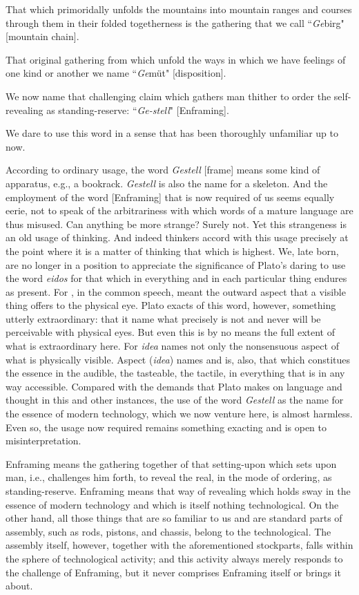 That which primoridally unfolds the mountains into mountain ranges and courses through them in their folded togetherness is the gathering that we call ``\textit{Ge}birg" [mountain chain].

That original gathering from which unfold the ways in which we have feelings of one kind or another we name ``\textit{Ge}m\"{u}t" [disposition].

We now name that challenging claim which gathers man thither to order the self-revealing as standing-reserve: ``\textit{Ge-stell}" [Enframing].

We dare to use this word in a sense that has been thoroughly unfamiliar up to now.

According to ordinary usage, the word \textit{Gestell} [frame] means some kind of apparatus, e.g., a bookrack. \textit{Gestell} is also the name for a skeleton. And the employment of the word  [Enframing] that is now required of us seems equally eerie, not to speak of the arbitrariness with which words of a mature language are thus misused. Can anything be more strange? Surely not. Yet this strangeness is an old usage of thinking. And indeed thinkers accord with this usage precisely at the point where it is a matter of thinking that which is highest. We, late born, are no longer in a position to appreciate the significance of Plato's daring to use the word \textit{eidos} for that which in everything and in each particular thing endures as present. For , in the common speech, meant the outward aspect that a visible thing offers to the physical eye. Plato exacts of this word, however, something utterly extraordinary: that it name what precisely is not and never will be perceivable with physical eyes. But even this is by no means the full extent of what is extraordinary here. For \textit{idea} names not only the nonsensuous aspect of what is physically visible. Aspect (\textit{idea}) names and is, also, that which constitues the essence in the audible, the tasteable, the tactile, in everything that is in any way accessible. Compared with the demands that Plato makes on language and thought in this and other instances, the use of the word \textit{Gestell} as the name for the essence of modern technology, which we now venture here, is almost harmless. Even so, the usage now required remains something exacting and is open to misinterpretation.

Enframing means the gathering together of that setting-upon which sets upon man, i.e., challenges him forth, to reveal the real, in the mode of ordering, as standing-reserve. Enframing means that way of revealing which holds sway in the essence of modern technology and which is itself nothing technological. On the other hand, all those things that are so familiar to us and are standard parts of assembly, such as rods, pistons, and chassis, belong to the technological. The assembly itself, however, together with the aforementioned stockparts, falls within the sphere of technological activity; and this activity always merely responds to the challenge of Enframing, but it never comprises Enframing itself or brings it about.

